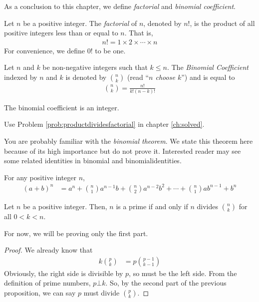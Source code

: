 As a conclusion to this chapter, we define \textit{factorial} and \textit{binomial coefficient}.

	\begin{definition}[Factorial]
		Let $n$ be a positive integer. The \textit{factorial} of $n$, denoted by $n!$, is the product of all positive integers less than or equal to $n$. That is,
			\begin{align*}
				n! = 1 \times 2 \times \cdots \times n
			\end{align*}
		For convenience, we define $0!$ to be one.
	\end{definition}

	\begin{definition}
		Let $n$ and $k$ be non-negative integers such that $k \leq n$. The \textit{Binomial Coefficient} indexed by $n$ and $k$ is denoted by $\displaystyle \binom{n}{k}$ (read ``\textit{$n$ choose $k$}'') and is equal to
			\begin{align*}
				\binom{n}{k} = \frac{n!}{k!(n-k)!}
			\end{align*}
	\end{definition}

	\begin{proposition}
		The binomial coefficient is an integer.
	\end{proposition}

	\begin{hint}
		Use Problem \ref{prob:productdividesfactorial} in chapter \autoref{ch:solved}.
	\end{hint}
You are probably familiar with the \textit{binomial theorem}. We state this theorem here because of its high importance but do not prove it. Interested reader may see some related identities in \gls{binomial} and \gls{binomialidentities}.
	\begin{theorem}
		For any positive integer $n$,
			\begin{align*}
				(a+b)^n & = a^n+\binom{n}{1}a^{n-1}b+\binom{n}{2}a^{n-2}b^2+\cdots+\binom{n}{1}ab^{n-1}+b^n
			\end{align*}
	\end{theorem}

	\begin{theorem}\label{thm:binpdiv}
		Let $n$ be a positive integer. Then, $n$ is a prime if and only if $n$ divides $\binom{n}{k}$ for all $0<k<n$.
	\end{theorem}%
For now, we will be proving only the first part.
	\begin{proof}
		We already know that
			\begin{align*}
				k\binom{p}{k} & = p\binom{p-1}{k-1}
			\end{align*}
		Obviously, the right side is divisible by $p$, so must be the left side. From the definition of prime numbers, $p\bot k$. So, by the second part of the previous proposition, we can say $p$ must divide $\binom{p}{k}$.
	\end{proof}
